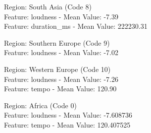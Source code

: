 Region: South Asia (Code 8) \\
Feature: loudness - Mean Value: -7.39\\
Feature: duration\_ms - Mean Value: 222230.31

Region: Southern Europe (Code 9) \\
Feature: loudness - Mean Value: -7.02

Region: Western Europe (Code 10) \\
Feature: loudness - Mean Value: -7.26\\
Feature: tempo - Mean Value: 120.90

Region: Africa (Code 0) \\
Feature: loudness - Mean Value: -7.608736\\
Feature: tempo - Mean Value: 120.407525

